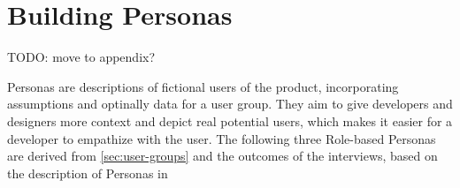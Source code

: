 \section{Building Personas}
\label{sec:personas}

TODO: move to appendix?

Personas are descriptions of fictional users of the product, incorporating assumptions and optinally data for a user group.
They aim to give developers and designers more context and depict real potential users, which makes it easier for a developer to empathize with the user.
The following three Role-based Personas are derived from \ref{sec:user-groups} and the outcomes of the interviews, based on the description of Personas in \cite[pp. 403-405]{Interactiondesign:2019ys}
